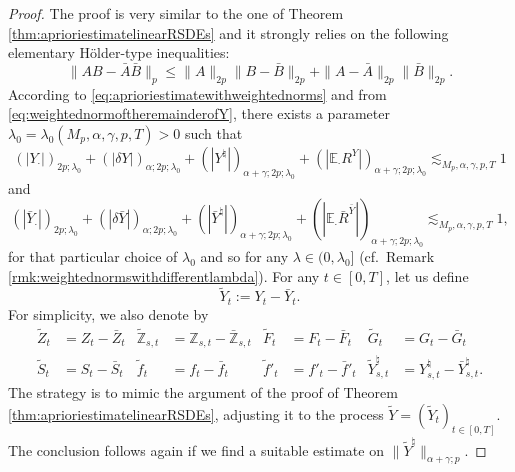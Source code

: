 \documentclass[11pt,a4paper]{article}
\newcommand{\E}{\mathbb{E}}
\theoremstyle{plain}
\begin{document}
\begin{proof} 
    The proof is very similar to the one of Theorem \ref{thm:aprioriestimatelinearRSDEs} and it strongly relies on the following elementary H\"older-type inequalities: \begin{equation}\label{eq:elementaryHolder}
        \|AB - \bar{A}\bar{B}\|_{p} \le \|A\|_{2p}\|B-\bar{B}\|_{2p}+\|A-\bar{A}\|_{2p}\|\bar{B}\|_{2p}.
    \end{equation} 
    According to \eqref{eq:aprioriestimatewithweightednorms} and from \eqref{eq:weightednormoftheremainderofY}, there exists a parameter $\lambda_0 = \lambda_0(M_p,\alpha,\gamma,p,T)>0$ such that \begin{equation*}
    (|Y_\cdot|)_{2p;\lambda_0} + (|\delta Y|)_{\alpha;2p;\lambda_0} + (|Y^\natural|)_{\alpha+\gamma;2p;\lambda_0} + (|\E_\cdot R^Y|)_{\alpha+\gamma;2p;\lambda_0}  \lesssim_{M_p,\alpha,\gamma,p,T} 1 \end{equation*} and \begin{equation*}    
    (|\bar{Y}_\cdot|)_{2p;\lambda_0} + (|\delta \bar{Y}|)_{\alpha;2p;\lambda_0} + (|\bar{Y}^\natural|)_{\alpha+\gamma;2p;\lambda_0} + (|\E_\cdot \bar{R}^{\bar{Y}} |)_{\alpha+\gamma;2p;\lambda_0} \lesssim_{M_p,\alpha,\gamma,p,T} 1, 
\end{equation*} for that particular choice of $\lambda_0$ and so for any $\lambda \in (0,\lambda_0]$ (cf.\ Remark \ref{rmk:weightednormswithdifferentlambda}). 
For any $t \in [0,T]$, let us define \begin{equation*}
    \tilde{Y}_t := Y_t - \bar{Y}_t.
\end{equation*} 
For simplicity, we also denote by \begin{align*}
    \tilde{Z}_t &= Z_t - \bar{Z}_t & \tilde{\mathbb{Z}}_{s,t} &= \mathbb{Z}_{s,t} - \bar{\mathbb{Z}}_{s,t} & \tilde{F}_t &= F_t - \bar{F}_t & 
    \tilde{G}_t &= G_t - \bar{G}_t  \\ \tilde{S}_t &= S_t - \bar{S}_t & \tilde{f}_t &= f_t - \bar{f}_t & \tilde{f}'_t &= f'_t - \bar{f}'_t &  \tilde{Y}^\natural_{s,t} &= Y^\natural_{s,t} - \bar{Y}^\natural_{s,t}.
\end{align*}
The strategy is to mimic the argument of the proof of Theorem \ref{thm:aprioriestimatelinearRSDEs}, adjusting it to the process $\tilde{Y}=(\tilde{Y}_t)_{t \in [0,T]}$. The conclusion follows again if we find a suitable estimate on $\|\tilde{Y}^\natural\|_{\alpha+\gamma;p}$.


\end{proof}
\end{document}
